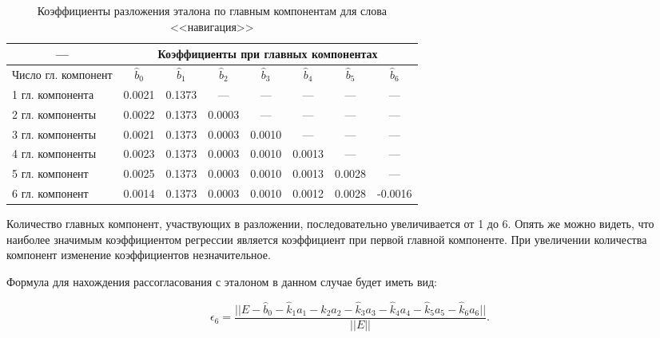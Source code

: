 \begin{table}[h]
	\centering
	\caption{Коэффициенты разложения эталона по главным компонентам для слова <<навигация>>}
	\label{tab:regressionCoefficientsNavigation}
	\begin{tabular}{| l | c | c | c | c | c | c | c |}
		\hline
		\multicolumn{1}{|c|}{---} & \multicolumn{7}{c|}{Коэффициенты при главных компонентах} \\
		\hline
		Число гл. компонент & $\widehat{b}_0$ & $\widehat{b}_1$ & $\widehat{b}_2$ & $\widehat{b}_3$ & $\widehat{b}_4$ & $\widehat{b}_5$ & $\widehat{b}_6$ \\
		\hline
		1 гл. компонента & 0.0021 & 0.1373 & \multicolumn{1}{c|}{---} & \multicolumn{1}{c|}{---} & \multicolumn{1}{c|}{---} & \multicolumn{1}{c|}{---} & \multicolumn{1}{c|}{---} \\
		2 гл. компоненты & 0.0022 & 0.1373 & 0.0003 & \multicolumn{1}{c|}{---} & \multicolumn{1}{c|}{---} & \multicolumn{1}{c|}{---} & \multicolumn{1}{c|}{---} \\
		3 гл. компоненты & 0.0021 & 0.1373 & 0.0003 & 0.0010 & \multicolumn{1}{c|}{---} & \multicolumn{1}{c|}{---} & \multicolumn{1}{c|}{---} \\
		4 гл. компоненты & 0.0023 & 0.1373 & 0.0003 & 0.0010 & 0.0013 & \multicolumn{1}{c|}{---} & \multicolumn{1}{c|}{---} \\
		5 гл. компонент  & 0.0025 & 0.1373 & 0.0003 & 0.0010 & 0.0013 & 0.0028 & \multicolumn{1}{c|}{---} \\
		6 гл. компонент  & 0.0014 & 0.1373 & 0.0003 & 0.0010 & 0.0012 & 0.0028 & -0.0016 \\
		\hline
	\end{tabular}
\end{table}

Количество главных компонент, участвующих в разложении, последовательно увеличивается от 1 до 6.
Опять же можно видеть, что наиболее значимым коэффициентом регрессии является коэффициент при первой главной компоненте.
При увеличении количества компонент изменение коэффициентов незначительное. 

Формула для нахождения рассогласования с эталоном в данном случае будет иметь вид:

\begin{equation} \label{eq:3_3_1_9}
\epsilon_6 = \frac{||E - \widehat{b}_0 - \widehat{k}_1 a_1 - \widehat{k}_2 a_2 - \widehat{k}_3 a_3 - \widehat{k}_4 a_4 - \widehat{k}_5 a_5 - \widehat{k}_6 a_6||}{||E||}.
\end{equation}

